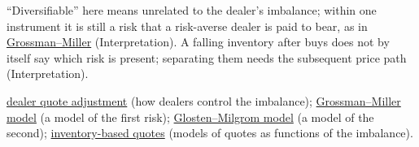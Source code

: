 \begin{qfdefinition}
 ``Diversifiable'' here means unrelated to the dealer's imbalance; within one instrument it is still a risk that a risk-averse dealer is paid to bear, as in \hyperref[mod:grossman-miller]{Grossman--Miller} (Interpretation). A falling inventory after buys does not by itself say which risk is present; separating them needs the subsequent price path (Interpretation).

 \hyperref[meth:dealer-quote-adjustment]{dealer quote adjustment} (how dealers control the imbalance); \hyperref[mod:grossman-miller]{Grossman--Miller model} (a model of the first risk); \hyperref[mod:glosten-milgrom]{Glosten--Milgrom model} (a model of the second); \hyperref[mod:inventory-based-quotes]{inventory-based quotes} (models of quotes as functions of the imbalance).

\end{qfdefinition}

